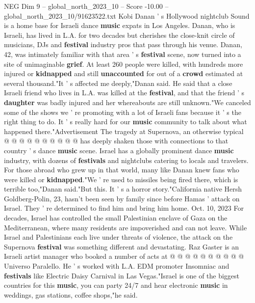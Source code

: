 \begin{textsample}{NEG Dim 9 – global\_north\_2023\_10 – Score -10.00 – global\_north\_2023\_10/91623522.txt}  \label{ex:f9_neg_032}
Kobi Danan ' s Hollywood nightclub Sound is a home base for Israeli dance \textbf{music} expats in Los Angeles.
Danan, who is Israeli, has lived in L.A. for two decades but cherishes the close-knit circle of musicians, DJs and \textbf{festival} industry pros that pass through his venue.
Danan, 42, was intimately familiar with that area ' s \textbf{festival} scene, now turned into a site of unimaginable \textbf{grief}.
At least 260 people were killed, with hundreds more injured or \textbf{kidnapped} and still \textbf{unaccounted} for out of a \textbf{crowd} estimated at several thousand."It ' s affected me deeply,"Danan said.
He said that a close Israeli friend who lives in L.A. was killed at the \textbf{festival}, and that the friend ' s \textbf{daughter} was badly injured and her whereabouts are still unknown."We canceled some of the shows we ' re promoting with a lot of Israeli fans because it ' s the right thing to do.
It ' s really hard for our \textbf{music} community to talk about what happened there."Advertisement The tragedy at Supernova, an otherwise typical @ @ @ @ @ @ @ @ @ @ has deeply shaken those with connections to that country ' s dance \textbf{music} scene.
Israel has a globally prominent dance \textbf{music} industry, with dozens of \textbf{festivals} and nightclubs catering to locals and travelers.
For those abroad who grew up in that world, many like Danan knew fans who were killed or \textbf{kidnapped}."We ' re used to missiles being fired there, which is terrible too,"Danan said."But this.
It ' s a horror story."California native Hersh Goldberg-Polin, 23, hasn't been seen by family since before Hamas ' attack on Israel.
They ' re determined to find him and bring him home.
Oct. 10, 2023 For decades, Israel has controlled the small Palestinian enclave of Gaza on the Mediterranean, where many residents are impoverished and can not leave.
While Israel and Palestinians each live under threats of violence, the attack on the Supernova \textbf{festival} was something different and devastating.
Raz Gaster is an Israeli artist manager who booked a number of acts at @ @ @ @ @ @ @ @ @ @ Universo Paralello.
He ' s worked with L.A.
EDM promoter Insomniac and \textbf{festivals} like Electric Daisy Carnival in Las Vegas."Israel is one of the biggest countries for this \textbf{music}, you can party 24/7 and hear electronic \textbf{music} in weddings, gas stations, coffee shops,"he said.

\end{textsample}
